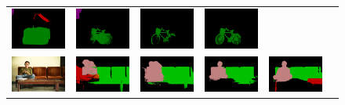 \begin{figure}[!htbp]
{\begin{tabular}{c c c c c c}
    \includegraphics[height=0.123\linewidth]{fig/val_crf_vis/bbox/2008_004363.png} &
    \includegraphics[height=0.123\linewidth]{fig/val_crf_vis/bbox_crf/2008_004363.png} &
    \includegraphics[height=0.123\linewidth]{fig/val_crf_vis/strongweak/2008_004363.png} &
    \includegraphics[height=0.123\linewidth]{fig/val_crf_vis/cocomix/2008_004363.png} \\
    \includegraphics[height=0.11\linewidth]{fig/val_crf_vis/img/2009_001299.jpg} &
    \includegraphics[height=0.11\linewidth]{fig/val_crf_vis/adaweak/2009_001299.png} &
    \includegraphics[height=0.11\linewidth]{fig/val_crf_vis/bbox/2009_001299.png} &
    \includegraphics[height=0.11\linewidth]{fig/val_crf_vis/bbox_crf/2009_001299.png} &
    \includegraphics[height=0.11\linewidth]{fig/val_crf_vis/strongweak/2009_001299.png} &

\end{tabular}}
\end{figure}
